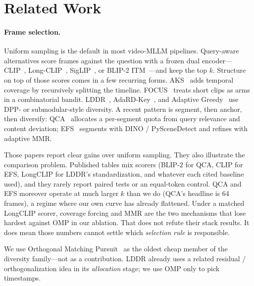 \documentclass[11pt]{article}
\begin{document}
\section{Related Work}

\paragraph{Frame selection.}
Uniform sampling is the default in most video-MLLM pipelines.
Query-aware alternatives score frames against the question with a frozen dual encoder---CLIP~\citep{radford2021clip}, Long-CLIP~\citep{zhang2024longclip}, SigLIP~\citep{zhai2023siglip}, or BLIP-2 ITM~\citep{li2023blip2}---and keep the top $k$.
Structure on top of those scores comes in a few recurring forms.
AKS~\citep{tang2025aks} adds temporal coverage by recursively splitting the timeline.
FOCUS~\citep{zhu2025focus} treats short clips as arms in a combinatorial bandit.
LDDR~\citep{chen2026lddr}, AdaRD-Key~\citep{adardkey2025}, and Adaptive Greedy~\citep{adaptivegreedy2026} use DPP- or submodular-style diversity.
A recent pattern is segment, then anchor, then diversify: QCA~\citep{peng2026qca} allocates a per-segment quota from query relevance and content deviation; EFS~\citep{chen2026efs} segments with DINO / PySceneDetect and refines with adaptive MMR.

Those papers report clear gains over uniform sampling.
They also illustrate the comparison problem.
Published tables mix scorers (BLIP-2 for QCA, CLIP for EFS, LongCLIP for LDDR's standardization, and whatever each cited baseline used), and they rarely report paired tests or an equal-token control.
QCA and EFS moreover operate at much larger $k$ than we do (QCA's headline is 64 frames), a regime where our own curve has already flattened.
Under a matched LongCLIP scorer, coverage forcing and MMR are the two mechanisms that lose hardest against OMP in our ablation.
That does not refute their stack results.
It does mean those numbers cannot settle which \emph{selection rule} is responsible.

We use Orthogonal Matching Pursuit~\citep{pati1993omp} as the oldest cheap member of the diversity family---not as a contribution.
LDDR already uses a related residual / orthogonalization idea in its \emph{allocation} stage; we use OMP only to pick timestamps.
\end{document}
